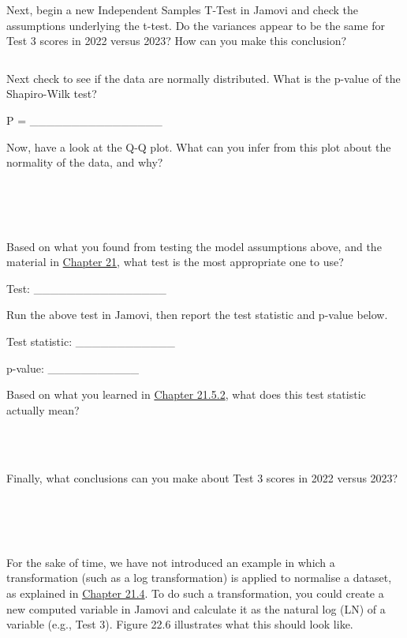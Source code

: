 \documentclass[
]{scrbook}
\begin{document}
Next, begin a new Independent Samples T-Test in Jamovi and check the assumptions underlying the t-test.
Do the variances appear to be the same for Test 3 scores in 2022 versus 2023?
How can you make this conclusion?

\begin{verbatim}

\end{verbatim}

Next check to see if the data are normally distributed.
What is the p-value of the Shapiro-Wilk test?

P = \_\_\_\_\_\_\_\_\_\_\_\_\_\_\_\_

Now, have a look at the Q-Q plot.
What can you infer from this plot about the normality of the data, and why?

\begin{verbatim}




\end{verbatim}

Based on what you found from testing the model assumptions above, and the material in \protect\hyperlink{Chapter_21}{Chapter 21}, what test is the most appropriate one to use?

Test: \_\_\_\_\_\_\_\_\_\_\_\_\_\_\_\_

Run the above test in Jamovi, then report the test statistic and p-value below.

Test statistic: \_\_\_\_\_\_\_\_\_\_\_\_

p-value: \_\_\_\_\_\_\_\_\_\_\_

Based on what you learned in \protect\hyperlink{mann-whitney-u-test}{Chapter 21.5.2}, what does this test statistic actually mean?

\begin{verbatim}



\end{verbatim}

Finally, what conclusions can you make about Test 3 scores in 2022 versus 2023?

\begin{verbatim}




\end{verbatim}

For the sake of time, we have not introduced an example in which a transformation (such as a log transformation) is applied to normalise a dataset, as explained in \protect\hyperlink{assumptions-of-t-tests}{Chapter 21.4}.
To do such a transformation, you could create a new computed variable in Jamovi and calculate it as the natural log (LN) of a variable (e.g., Test 3).
Figure 22.6 illustrates what this should look like.
\end{document}
